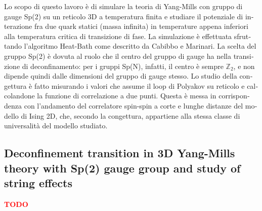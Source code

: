 \documentclass[reqno,11pt]{article}
\numberwithin{equation}{section}
\newcommand{\red}[1]{\textbf{\textcolor{red}{#1}}}
\begin{document}
\begin{otherlanguage}{italian}
Lo scopo di questo lavoro è di simulare la teoria di Yang-Mills con gruppo di gauge Sp(2) su un reticolo 3D a temperatura finita 
e studiare il potenziale di interazione fra due quark statici (massa infinita) in temperature appena inferiori alla temperatura
critica di transizione di fase. La simulazione è effettuata sfruttando l'algoritmo Heat-Bath come descritto da Cabibbo e Marinari.
La scelta del gruppo Sp(2) è dovuta al ruolo che il centro del gruppo di gauge ha nella transizione di deconfinamento: per i gruppi
Sp(N), infatti, il centro è sempre $\mathbb{Z}_2$, e non dipende quindi dalle dimensioni del gruppo di gauge stesso. Lo studio
della congettura è fatto misurando i valori che assume il loop di Polyakov su reticolo e calcolandone la funzione di correlazione
a due punti. Questa è messa in corrispondenza con l'andamento del correlatore spin-spin a corte e lunghe distanze del modello di Ising 2D,
che, secondo la congettura, appartiene alla stessa classe di universalità del modello studiato.

\end{otherlanguage}
\subsection*{Deconfinement transition in 3D Yang-Mills theory with Sp(2) gauge group and study of string effects}

\red{TODO}
\end{document}
